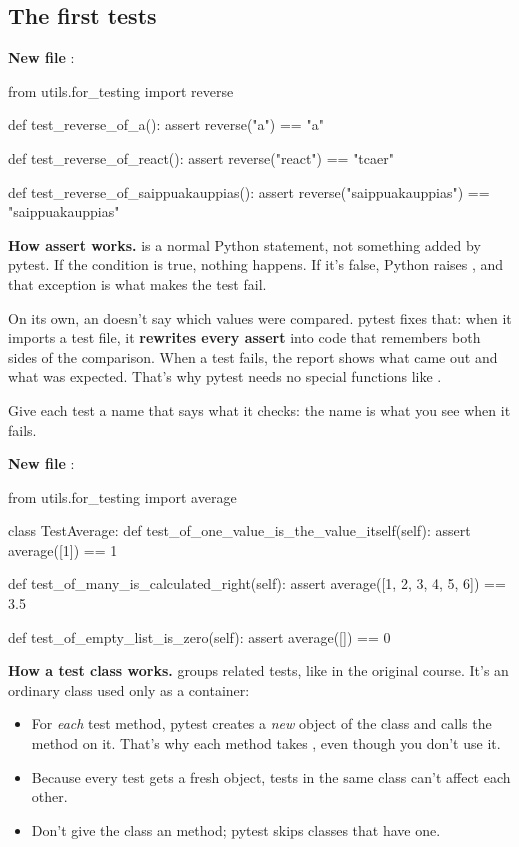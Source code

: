\subsection{The first tests}

\textbf{New file} :

\begin{py}
from utils.for_testing import reverse


def test_reverse_of_a():
	assert reverse("a") == "a"


def test_reverse_of_react():
	assert reverse("react") == "tcaer"


def test_reverse_of_saippuakauppias():
	assert reverse("saippuakauppias") == "saippuakauppias"
\end{py}

\textbf{How assert works.}  is a normal Python statement, not something added by pytest. If the condition is true, nothing happens. If it's false, Python raises , and that exception is what makes the test fail.

On its own, an  doesn't say which values were compared. pytest fixes that: when it imports a test file, it \textbf{rewrites every assert} into code that remembers both sides of the comparison. When a test fails, the report shows what came out and what was expected. That's why pytest needs no special functions like .

Give each test a name that says what it checks: the name is what you see when it fails.

\textbf{New file} :

\begin{py}
from utils.for_testing import average


class TestAverage:
	def test_of_one_value_is_the_value_itself(self):
		assert average([1]) == 1

	def test_of_many_is_calculated_right(self):
		assert average([1, 2, 3, 4, 5, 6]) == 3.5

	def test_of_empty_list_is_zero(self):
		assert average([]) == 0
\end{py}

\textbf{How a test class works.}  groups related tests, like  in the original course. It's an ordinary class used only as a container:
\begin{itemize}
\item For \emph{each} test method, pytest creates a \emph{new} object of the class and calls the method on it. That's why each method takes , even though you don't use it.
\item Because every test gets a fresh object, tests in the same class can't affect each other.
\item Don't give the class an  method; pytest skips classes that have one.
\end{itemize}

